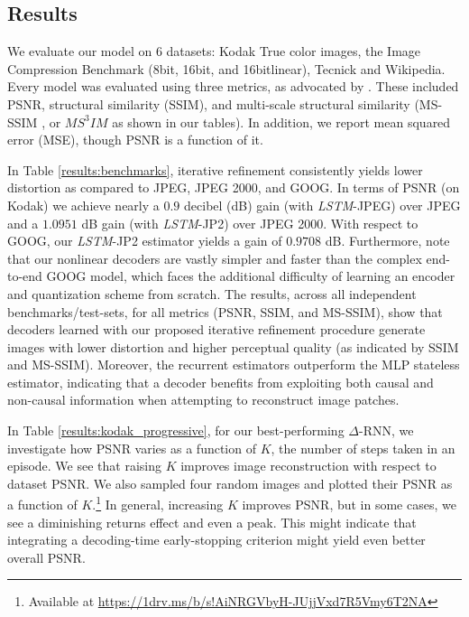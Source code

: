 \documentclass[smallabstract,smallcaptions]{dccpaper}
\begin{document}
\subsection{Results}
We evaluate our model on 6 datasets: Kodak True color images, the Image Compression Benchmark (8bit, 16bit, and 16bitlinear), Tecnick and Wikipedia. Every model was evaluated using three metrics, as advocated by \cite{ma2016group}. These included PSNR, structural similarity (SSIM), and multi-scale structural similarity (MS-SSIM \cite{wang2004imagequality}, or $MS^3IM$ as shown in our tables). In addition, we report mean squared error (MSE), though PSNR is a function of it. 

In Table \ref{results:benchmarks}, iterative refinement consistently yields lower distortion as compared to JPEG, JPEG 2000, and GOOG. In terms of PSNR (on Kodak) we achieve nearly a $0.9$ decibel (dB) gain (with \emph{LSTM}-JPEG) over JPEG and a $1.0951$ dB gain (with \emph{LSTM}-JP2) over JPEG 2000. With respect to GOOG, our \emph{LSTM}-JP2 estimator yields a gain of $0.9708$ dB. Furthermore, note that our nonlinear decoders are vastly simpler and faster than the complex end-to-end GOOG model, which faces the additional difficulty of learning an encoder and quantization scheme from scratch. The results, across all independent benchmarks/test-sets, for all metrics (PSNR, SSIM, and MS-SSIM), show that decoders learned with our proposed iterative refinement procedure generate images with lower distortion and higher perceptual quality (as indicated by SSIM and MS-SSIM). Moreover, the recurrent estimators outperform the MLP stateless estimator, indicating that a decoder benefits from exploiting both causal and non-causal information when attempting to reconstruct image patches.

In Table \ref{results:kodak_progressive}, for our best-performing $\Delta$-RNN, we investigate how PSNR varies as a function of $K$, the number of steps taken in an episode. We see that raising $K$ improves image reconstruction with respect to dataset PSNR. We also sampled four random images and plotted their PSNR as a function of $K$.\footnote{Available at \url{https://1drv.ms/b/s!AiNRGVbyH-JUjjVxd7R5Vmy6T2NA}} In general, increasing $K$ improves PSNR, but in some cases, we see a diminishing returns effect and even a peak. This might indicate that integrating a decoding-time early-stopping criterion might yield even better overall PSNR.
\end{document}
